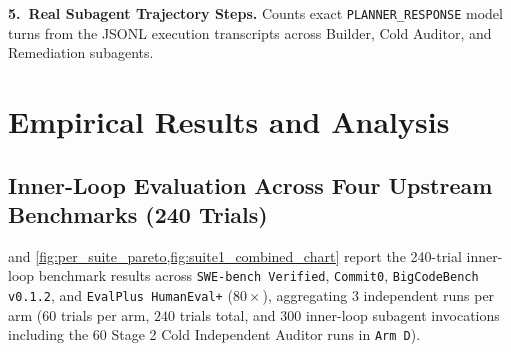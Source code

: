 \documentclass[11pt,a4paper,copyright]{google}
\begin{document}
\textbf{5.\ Real Subagent Trajectory Steps.} Counts exact \texttt{PLANNER\_RESPONSE} model turns from the JSONL execution transcripts across Builder, Cold Auditor, and Remediation subagents.

\section{Empirical Results and Analysis}
\label{sec:results}

\subsection{Inner-Loop Evaluation Across Four Upstream Benchmarks (240 Trials)}
\label{subsec:suite1_results}

 and \cref{fig:per_suite_pareto,fig:suite1_combined_chart} report the 240-trial inner-loop benchmark results across \texttt{SWE-bench Verified}, \texttt{Commit0}, \texttt{BigCodeBench v0.1.2}, and \texttt{EvalPlus HumanEval+} ($80\times$), aggregating $3$ independent runs per arm ($60$ trials per arm, $240$ trials total, and $300$ inner-loop subagent invocations including the $60$ Stage 2 Cold Independent Auditor runs in \texttt{Arm D}).
\end{document}
